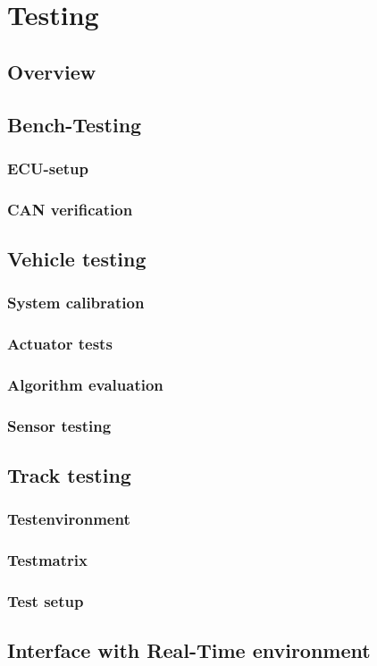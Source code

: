 \documentclass[ExampleMasters.tex]{subfiles}
\begin{document}
\clearpage
\chapter{Testing}


\section{Overview}



\section{Bench-Testing}
\subsection{ECU-setup}
\subsection{CAN verification}


\section{Vehicle testing}
\subsection{System calibration}
\subsection{Actuator tests}
\subsection{Algorithm evaluation}
\subsection{Sensor testing}


\section{Track testing}

\subsection{Testenvironment}
\subsection{Testmatrix}
\subsection{Test setup}


\section{Interface with Real-Time environment}
\end{document}
